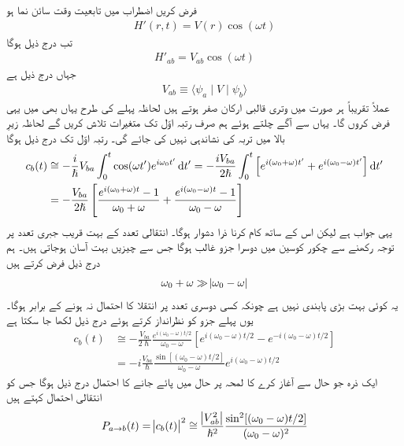 فرض کریں اضطراب میں تابعیت وقت سائن نما ہو 
\begin{align}
	H'(r, t) = V(r)\cos(\omega t)
\end{align}
تب درج ذیل ہوگا
\begin{align}
	H'_{ab}=V_{ab}\cos(\omega t)
\end{align}
جہاں  درج ذیل ہے
\begin{align}
	V_{ab}\equiv\langle\psi_a\mid V\mid\psi_b\rangle
\end{align}
عملاً تقریباً ہر صورت میں وتری قالبی ارکان صفر ہوتے ہیں لحاظہ پہلے کی طرح یہاں بھی میں یہی فرض کروں گا۔ یہاں سے آگے چلتے ہوئے ہم صرف رتبہ اوّل تک متغیرات تلاش کریں گے لحاظہ زیرِ بالا میں تربہ کی نشاندہی نہیں کی جائے گی۔ رتبہ اوّل تک درج ذیل ہوگا  
\begin{align}
	c_b(t) &\cong-\frac{i}{\hslash}V_{ba}\int_{0}^{t}\cos(\omega t')e^{i\omega_0 t'}\dif t' = -\frac{iV_{ba}}{2\hslash}\int_{0}^{t}\left[e^{i(\omega_0+\omega)t'}+e^{i(\omega_0-\omega)t'}\right]\dif t' \nonumber \\
	&=-\frac{V_{ba}}{2\hslash}\left[\frac{e^{i(\omega_0+\omega)t}-1}{\omega_0+\omega}+\frac{e^{i(\omega_0-\omega)t}-1}{\omega_0-\omega}\right]
\end{align}
یہی جواب ہے لیکن اس کے ساتھ کام کرنا ذرا دشوار ہوگا۔ انتقالی تعدد  کے بہت قریب جبری تعدد  پر توجہ رکھنے سے چکور کوسین میں دوسرا جزو غالب ہوگا جس سے چیزیں بہت آسان ہوجاتی ہیں۔ ہم درج ذیل فرض کرتے ہیں
\begin{align}
	\omega_0+\omega\gg\abs{\omega_0-\omega}
\end{align}
یہ کوئی بہت بڑی پابندی نہیں ہے چونکہ کسی دوسری تعدد پر انتقلا کا احتمال نہ ہونے کے برابر ہوگا۔ یوں پہلے جزو کو نظرانداز کرتے ہوئے درج ذیل لکھا جا سکتا ہے
\begin{align}
	c_b(t) &\cong-\frac{V_{ba}}{2\hslash}\frac{e^{i(\omega_0-\omega)t/2}}{\omega_0-\omega}\left[e^{i(\omega_0-\omega)t/2}-e^{-i(\omega_0-\omega)t/2}\right]\nonumber \\
	&=-i\frac{V_{ba}}{\hslash}\frac{\sin[(\omega_0-\omega)t/2]}{\omega_0-\omega}e^{i(\omega_0-\omega)t/2}
\end{align}
ایک ذرہ جو حال  سے آغاز کرے کا لمحہ پر حال  میں پائے جانے کا احتمال درج ذیل ہوگا جس کو انتقالی احتمال کہتے ہیں 
\begin{align}
	P_{a\to b}(t)=\abs{c_b(t)}^2\cong\frac{\abs{V_{ab}^2}}{\hslash^2}\frac{\sin^2[(\omega_0-\omega)t/2]}{(\omega_0-\omega)^2}
\end{align}
